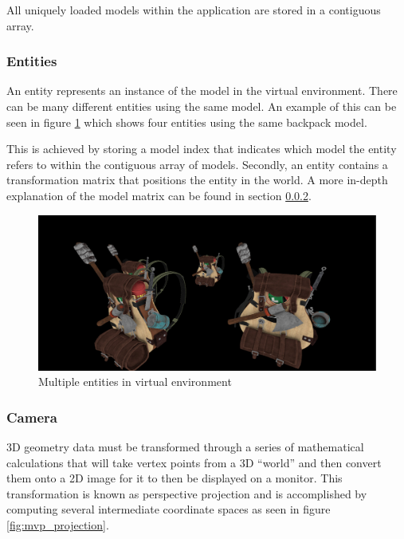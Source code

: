 \documentclass[11pt]{article}
\begin{document}
All uniquely loaded models within the application are stored in a contiguous
array. 

\subsubsection{Entities}
An entity represents an instance of the model in the virtual environment. There
can be many different entities using the same model. An example of this can be
seen in figure \ref{fig:entities} which shows four entities using the same
backpack model.

This is achieved by storing a model index that indicates which model the entity
refers to within the contiguous array of models. Secondly, an entity contains a
transformation matrix that positions the entity in the world. A more in-depth
explanation of the model matrix can be found in section \ref{camera}.

\begin{figure}[h!]
  \centering
  \includegraphics[width=\textwidth]{images/entities.png}
  \caption{Multiple entities in virtual environment}
  \label{fig:entities}
\end{figure}

\subsubsection{Camera} \label{camera}
3D geometry data must be transformed through a series of mathematical
calculations that will take vertex points from a 3D ``world'' and then convert
them onto a 2D image for it to then be displayed on a monitor. This
transformation is known as perspective projection \cite{3d_projection} and is
accomplished by computing several intermediate coordinate spaces as seen in
figure \ref{fig:mvp_projection}.
\end{document}
